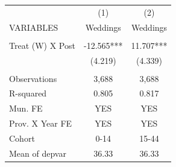 \begin{tabular}{lcc} \hline
 & (1) & (2) \\
VARIABLES & Weddings & Weddings \\ \hline
 &  &  \\
Treat (W) X Post & -12.565*** & 11.707*** \\
 & (4.219) & (4.339) \\
 &  &  \\
Observations & 3,688 & 3,688 \\
R-squared & 0.805 & 0.817 \\
Mun. FE & YES & YES \\
Prov. X Year FE & YES & YES \\
Cohort & 0-14 & 15-44 \\
 Mean of depvar & 36.33 & 36.33 \\ \hline
\end{tabular}
